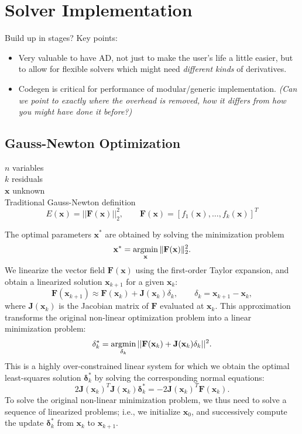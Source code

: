 \section{Solver Implementation}
\label{sub:solver}

Build up in stages?
Key points:

\begin{itemize}
  \item Very valuable to have AD, not just to make the user's life a little easier, but to allow for flexible solvers which might need \emph{different kinds} of derivatives.
  \item Codegen is critical for performance of modular/generic implementation. \emph{(Can we point to exactly where the overhead is removed, how it differs from how you might have done it before?)}
\end{itemize}

\subsection{Gauss-Newton Optimization} %
\label{sec:jtj}
$n$ variables\\
$k$ residuals\\
$\mathbf{x}$ unknown\\
Traditional Gauss-Newton definition
$$E (\mathbf{x}) = || \mathbf{F}(\mathbf{x}) ||_2^2,\qquad \mathbf{F}(\mathbf{x})  =[f_1(\mathbf{x}), \hdots, f_k(\mathbf{x})]^T$$



The optimal parameters $\mathbf{x}^{*}$ are obtained by solving the minimization problem
$$ \mathbf{x}^{*} = \displaystyle \operatorname*{argmin}_\mathbf{x} \Vert \mathbf{F} (\mathbf{x}) \Vert_2^2.$$
%
We linearize the vector field $\mathbf{F}(\mathbf{x})$ using the first-order Taylor expansion,
and obtain a linearized solution $\mathbf{x}_{k+1}$ for a given $\mathbf{x}_k$:
$$ \mathbf{F}(\mathbf{x}_{k+1}) \approx \mathbf{F}(\mathbf{x}_{k})+\mathbf{J}(\mathbf{x}_{k})\delta_k,\qquad \delta_k = \mathbf{x}_{k+1}-\mathbf{x}_{k},$$
where $\mathbf{J}(\mathbf{x}_k)$ is the Jacobian matrix of $\mathbf{F}$ evaluated at $\mathbf{x}_k$.
This approximation transforms the original non-linear optimization problem into a linear minimization problem:
$$
\mathbf{\delta}_{k}^{*}=\operatorname*{argmin}_{\mathbf{\delta}_{k}}{||\mathbf{F}(\mathbf{x}_{k})+\mathbf{J}(\mathbf{x}_{k})\mathbf{\delta}_{k}||^2}.
$$
This is a highly over-constrained linear system for which we obtain the optimal least-squares solution $\mathbf{\delta}_k^{*}$ by solving the corresponding normal equations:
$$
2 \mathbf{J}(\mathbf{x}_{k})^T\mathbf{J}(\mathbf{x}_{k})\mathbf{\delta}_{k}^{*} = - 2\mathbf{J}(\mathbf{x}_{k})^T\mathbf{F}(\mathbf{x}_{k}).
$$
To solve the original non-linear minimization problem, we thus need to solve a sequence of linearized problems;
i.e., we initialize $\mathbf{x}_0$, and successively compute the update $\mathbf{\delta}_k^{*}$ from $\mathbf{x}_k$ to $\mathbf{x}_{k+1}$.
